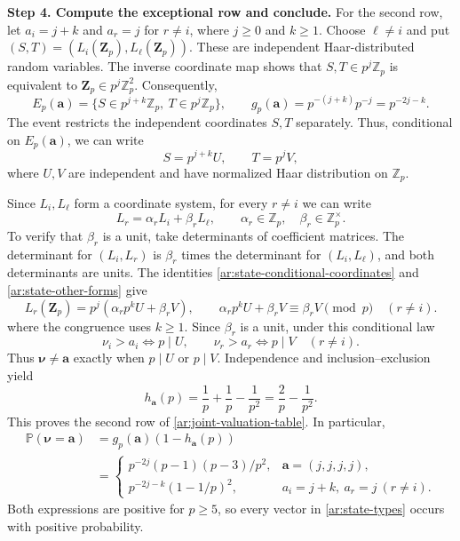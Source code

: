 \documentclass[twoside]{aomart}
\makeatletter
\theoremstyle{paperplain}
\theoremstyle{paperdefinition}
\renewenvironment{proof}[1][\proofname]{\par\pushQED{\qed}%
  \normalfont\topsep6\p@\@plus3\p@\relax\trivlist
  \item[\hskip\labelsep\itshape #1\@addpunct{.}]\ignorespaces
}{\popQED\endtrivlist\@endpefalse}
\newcommand{\Z}{\mathbb Z}
\newcommand{\Pp}{\mathbb P}
\numberwithin{equation}{section}
\makeatother
\begin{document}
\begin{proof}
\medskip
\noindent\textbf{Step 4. Compute the exceptional row and conclude.}
For the second row, let $a_i=j+k$ and $a_r=j$ for $r\ne i$,
where $j\ge0$ and $k\ge1$.
Choose $\ell\ne i$ and put
$(S,T)=(L_i(\mathbf Z_p),L_\ell(\mathbf Z_p))$.
These are independent Haar-distributed random variables.
The inverse coordinate map shows that $S,T\in p^j\Z_p$
is equivalent to $\mathbf Z_p\in p^j\Z_p^2$.
Consequently,
\begin{equation*}
 E_p(\mathbf a)=\{S\in p^{j+k}\Z_p,\ T\in p^j\Z_p\},\qquad
 g_p(\mathbf a)=p^{-(j+k)}p^{-j}=p^{-2j-k}.
 \end{equation*}
The event restricts the independent coordinates $S,T$ separately.
Thus, conditional on $E_p(\mathbf a)$, we can write
\begin{equation}
 S=p^{j+k}U,\qquad T=p^jV,
 \label{ar:state-conditional-coordinates}
\end{equation}
where $U,V$ are independent and have normalized Haar distribution
on $\Z_p$.

Since $L_i,L_\ell$ form a coordinate system, for every $r\ne i$
we can write
\begin{equation}
 L_r=\alpha_rL_i+\beta_rL_\ell,\qquad
 \alpha_r\in\Z_p,\quad\beta_r\in\Z_p^\times.
 \label{ar:state-other-forms}
\end{equation}
To verify that $\beta_r$ is a unit, take determinants of
coefficient matrices. The determinant for $(L_i,L_r)$ is
$\beta_r$ times the determinant for $(L_i,L_\ell)$,
and both determinants are units.
The identities \eqref{ar:state-conditional-coordinates} and
\eqref{ar:state-other-forms} give
\begin{equation*}
 L_r(\mathbf Z_p)=p^j(\alpha_rp^kU+\beta_rV),\qquad \alpha_rp^kU+\beta_rV\equiv\beta_rV\pmod p\quad(r\ne i).
\end{equation*}
where the congruence uses $k\ge1$.
Since $\beta_r$ is a unit, under this conditional law
\begin{equation*}
 \nu_i>a_i\iff p\mid U,\qquad
 \nu_r>a_r\iff p\mid V\quad(r\ne i).
 \end{equation*}
Thus $\boldsymbol\nu\ne\mathbf a$ exactly when $p\mid U$ or
$p\mid V$. Independence and inclusion--exclusion yield
\begin{equation*}
 h_{\mathbf a}(p)=\frac1p+\frac1p-\frac1{p^2}
 =\frac2p-\frac1{p^2}.
 \end{equation*}
This proves the second row of \eqref{ar:joint-valuation-table}.
In particular,
\begin{equation*}
 \begin{aligned}
 \Pp(\boldsymbol\nu=\mathbf a)
 &=g_p(\mathbf a)(1-h_{\mathbf a}(p))\\
 &=\begin{cases}
 p^{-2j}(p-1)(p-3)/p^2,&\mathbf a=(j,j,j,j),\\
 p^{-2j-k}(1-1/p)^2,&a_i=j+k,\ a_r=j\ (r\ne i).
 \end{cases}
 \end{aligned}
 \end{equation*}
Both expressions are positive for $p\ge5$, so every vector
in \eqref{ar:state-types} occurs with positive probability.
\end{proof}
\end{document}
